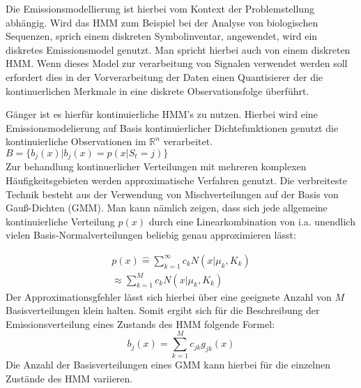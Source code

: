 Die Emissionsmodellierung ist hierbei vom Kontext der Problemstellung abhängig.
Wird das \acl{HMM} zum Beispiel bei der Analyse von biologischen Sequenzen,
sprich einem diskreten Symbolinventar, angewendet, wird ein diskretes
Emissionsmodel genutzt. Man spricht hierbei auch von einem diskreten \acl{HMM}.
Wenn dieses Model zur verarbeitung von Signalen verwendet werden soll erfordert
dies in der Vorverarbeitung der Daten einen Quantisierer der die
kontinuerlichen Merkmale in eine diskrete Observationsfolge überführt. 

Gänger ist es hierfür kontinuierliche \acl{HMM}'s zu nutzen. Hierbei wird eine
Emissionsmodelierung auf Basis kontinuierlicher Dichtefunktionen genutzt die
kontinuierliche Observationen im \(\mathbb{R}^n\) verarbeitet.\\ 
\( B =\{ b_{j}(x) | b_{j}(x) = p(x|S_t = j) \} \)\\
Zur behandlung kontinuerlicher Verteilungen mit mehreren komplexen
Häufigkeitsgebieten werden approximatische Verfahren genutzt. Die verbreiteste
Technik besteht aus der Verwendung von Mischverteilungen auf der Basis von
Gauß-Dichten (\acl{GMM}). Man kann nämlich zeigen, dass sich jede allgemeine
kontinuierliche Verteilung \(p(x)\) durch eine Linearkombination von i.a. unendlich vielen
Basis-Normalverteilungen beliebig genau approximieren lässt\cite[69]{mmmFink}:
 
\begin{multline}
p(x) \hat{=} \sum_{k=1}^\infty c_{k} N(x|\mu_{k},K_{k})\\
\approx \sum_{k=1}^M c_{k} N(x|\mu_{k},K_{k})  
\end{multline}
Der Approximationsgfehler lässt sich hierbei über eine geeignete Anzahl von
\(M\) Basisverteilungen klein halten. Somit ergibt sich für die Beschreibung der
Emissionsverteilung eines Zustands des \acl{HMM} folgende Formel:
\begin{equation}
b_{j}(x) = \sum_{k=1}^M c_{jk}g_{jk}(x)
\end{equation}
Die Anzahl der Basisverteilungen eines \acl{GMM} kann hierbei für die einzelnen
Zustände des HMM variieren.\\

